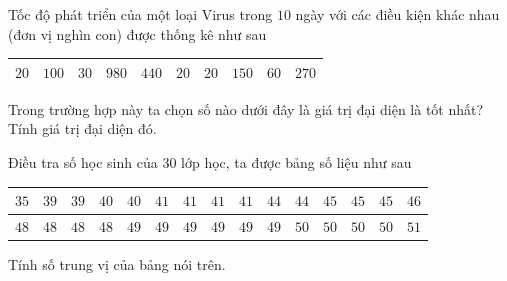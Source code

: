 \begin{ex}%
	Tốc độ phát triển của một loại Virus trong $10$ ngày với các điều kiện khác nhau (đơn vị nghìn  con) được thống kê như sau
	\begin{center}
		\begin{tabular}{|l|l|l|l|l|l|l|l|l|l|}
			\hline $20$&$100$&$30$&$980$&$440$&$20$&$20$&$150$&$60$&$270$\\ 
			\hline 
		\end{tabular}
	\end{center}
	Trong trường hợp này ta chọn số nào dưới đây  là giá trị đại diện là tốt nhất? Tính giá trị đại diện đó.
\end{ex}

\begin{ex}%
	 Điều tra số học sinh của $30$ lớp học, ta được bảng số liệu như sau
	\begin{center}
		\begin{tabular}{|l|l|l|l|l|l|l|l|l|l|l|l|l|l|l|}
			\hline $35$&$39$&$39$&$40$&$40$&$41$&$41$&$41$&$41$&$44$&$44$&$45$&$45$&$45$&$46$\\ 
			\hline  $48$&$48$&$48$&$48$&$49$&$49$&$49$&$49$&$49$&$49$&$50$&$50$&$50$&$50$&$51$\\
			 \hline
		\end{tabular}
	\end{center}
	Tính số  trung vị của bảng nói trên.
\end{ex}

